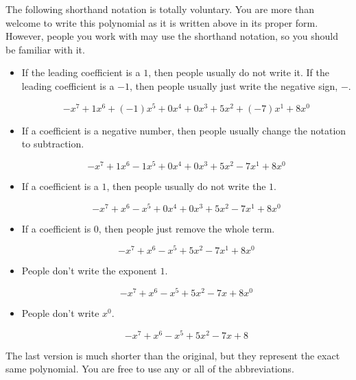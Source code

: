 \documentclass{ximera}
\begin{document}
The following shorthand notation is totally voluntary.  You are more than welcome to write this polynomial as it is written above in its proper form. However, people you work with may use the shorthand notation, so you should be familiar with it.



\begin{itemize}
\item If the leading coefficient is a $1$, then people usually do not write it. If the leading coefficient is a $-1$, then people usually just write the negative sign, $-$.


\[  -x^7 + 1 x^6 + (-1) x^5 + 0 x^4 + 0 x^3 + 5 x^2 + (-7) x^1 + 8 x^0              \]


\item If a coefficient is a negative number, then people usually change the notation to subtraction.


\[  -x^7 + 1 x^6 - 1 x^5 + 0 x^4 + 0 x^3 + 5 x^2 - 7 x^1 + 8 x^0              \]



\item If a coefficient is a $1$, then people usually do not write the $1$.


\[  -x^7 + x^6 - x^5 + 0 x^4 + 0 x^3 + 5 x^2 - 7 x^1 + 8 x^0              \]


\item If a coefficient is $0$, then people just remove the whole term.

\[  -x^7 + x^6 - x^5 + 5 x^2 - 7 x^1 + 8 x^0              \]


\item People don't write the exponent $1$.

\[  -x^7 + x^6 - x^5 + 5 x^2 - 7 x + 8 x^0              \]



\item People don't write $x^0$.

\[  -x^7 + x^6 - x^5 + 5 x^2 - 7 x + 8             \]




\end{itemize}




The last version is much shorter than the original, but they represent the exact same polynomial. You are free to use any or all of the abbreviations.\\
\end{document}
